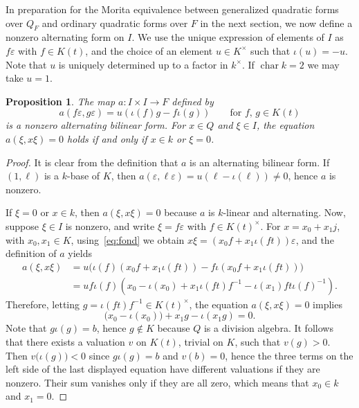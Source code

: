 \documentclass{amsart}
\newcommand{\FQ}{F}
\DeclareMathOperator{\charac}{char}
\newtheorem{prop}{Proposition}[section]
\theoremstyle{remark}
\begin{document}
In preparation for the Morita equivalence between generalized
quadratic forms over $Q_F$ and ordinary quadratic forms over $F$ in
the next section, we now define a nonzero alternating form on $I$. 
We use the unique expression of elements of $I$ as $f\varepsilon$ with
$f\in K(t)$, and the choice of an element $u\in K^\times$ such that
$\iota(u)=-u$. Note that $u$ is
uniquely determined up to a factor in $k^\times$. If $\charac k=2$ we may take $u=1$. 



\begin{prop}
  \label{prop:defa}
  The map $a\colon I\times I\to \FQ$ defined by
  \[
    a(f\varepsilon, g\varepsilon) = u(\iota(f)g-f\iota(g))
    \qquad\text{for $f$, $g\in K(t)$}
  \]
  is a nonzero alternating bilinear form. For $x\in Q$ and $\xi\in I$,
  the equation 
  $a(\xi, x\xi)=0$ holds if and only if $x\in k$ or $\xi=0$.
\end{prop}

\begin{proof}
  It is clear from the definition that $a$ is an alternating bilinear
  form. If $(1,\ell)$ is a $k$-base of $K$, then $a(\varepsilon,
  \ell\varepsilon) = u(\ell-\iota(\ell))\neq0$, hence $a$ is
  nonzero.

  If $\xi=0$ or $x\in k$, then $a(\xi,x\xi)=0$ because $a$ is
  $k$-linear and alternating.
  Now, suppose $\xi\in I$ is nonzero, and write $\xi=f\varepsilon$
  with $f\in K(t)^\times$. For $x=x_0+x_1j$, with $x_0,x_1\in K$,  
  using~\eqref{eq:fond} we obtain $x\xi =
  (x_0f+x_1\iota(ft))\varepsilon$, and the definition of $a$
  yields 
  \begin{align*}
    a(\xi, x\xi) &=
    u\bigl(\iota(f)(x_0f+x_1\iota(ft)) - 
    f\iota(x_0f+x_1\iota(ft))\bigr)
    \\ &=
    uf\iota(f)(x_0-\iota(x_0)
    +x_1\iota(ft)f^{-1}-\iota(x_1)ft\iota(f)^{-1}). 
  \end{align*}
  Therefore, letting $g=\iota(ft)f^{-1}\in K(t)^\times$, the equation
  $a(\xi, x\xi) =0$ implies 
  \[
    \bigl(x_0-\iota(x_0)\bigr) +x_1g-\iota(x_1g)=0.
  \]
  Note that $g\iota(g)=b$, hence $g\notin K$ because $Q$ is a division
  algebra. It follows that there exists a valuation $v$ on $K(t)$,
  trivial on $K$, such that $v(g)>0$. Then $v\bigl(\iota(g)\bigr)<0$
  since $g\iota(g)=b$ and $v(b)=0$, hence
  the three terms on the left side of the last displayed equation
  have different valuations if they are nonzero. Their sum vanishes
  only if they are all zero, which means that $x_0\in k$ and $x_1=0$.
\end{proof}
\end{document}
